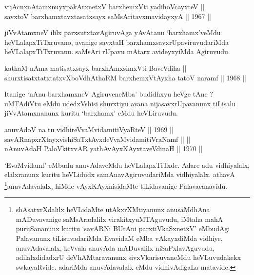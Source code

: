 
\begin{shl}
vijAcnxnAtamxnuyxpakArxnetxV barxhemxVti yadihoVcayxteV || \\
savxtoV barxhamxtavxtasatxsayx saMsAritavxmavidayxyA \hfill || 1967 ||
  
\end{shl}

\begin{artha}
jiVvAtamxneV ililx parxsutxtavAgiruvAga yAvAtanu `barxhamx'veMdu
heVLalapxTiTxruvano, avanige savxtaH barxhamxsavxrUpaviruvudariMda
heVLalapxTiTxruvanu. saMsAri rUpavu mAtarx avideyxyiMda Agiruvudu.
\end{artha}


\begin{shl}
kathaM nAma matisatxsayx barxhAmxsimxVti BaveVdiha || \\
shurxtisatxtatxtatxvXboVdhAthaRM barxhemxVtAyxha tatoV naramf \hfill || 1968 ||
  
\end{shl}

\begin{artha}
Itanige `nAnu barxhamxneV AgiruveneMba' budidhxyu heVge tAne ?
uMTAdiVtu eMdu udedxVshisi shurxtiyu avana nijasavxrUpavanunx tiLisalu
jiVvAtamxnanunx kuritu `barxhamx' eMdu heVLiruvudu.
\end{artha}


\begin{shl}
anuvAdoV na tu vidhireVvaMvidamitiVyaRteV \hfill || 1969 ||\\
\footnotemark[1]savARnapxrXtayxvishiSaTxtAvxdeVvaMvidamitiVraNamf ||  || \\
nAnuvAdaH PaloVkitxvAR yathAvAyxKAyxtaveVdinaH \hfill || 1970 ||
  
\end{shl}

\begin{artha}
`EvaMvidamf' eMbudu anuvAdaveMdu heVLalapxTiTxde. Adare
adu vidhiyalalx, elalxranunx kuritu heVLidudx samAnavAgiruvudariMda
vidhiyalalx. athavA \footnote{shAsatxrXdalilx heVLidaMte
utAkxrXMtiyanunx anusaMdhAna mADuvavanige saMsAradalilx
virakitxyuMTAguvudu, iMtaha mahA puruSananunx kuritu `savARNi BUtAni parxtiVkaSxnetxV'
eMbudAgi Palavanunx tiLisuvadariMda EvavidaM eMba vAkayxdiMda
vidhiye, anuvAdavalalx, keVvala anuvAda mADuvalilx
niSaPxlavAguvudu, adilalxdidadxrU deVhAMtaravanunx
sivxVkarisuvaneMdu heVLuvudakekx swkayaRvide. adariMda anuvAdavalalx
eMdu vidhivAdigaLa matavide.}anuvAdavalalx, hiMde
vAyxKAyxnisidaMte tiLidavanige Palavacanavidu.
\end{artha}

